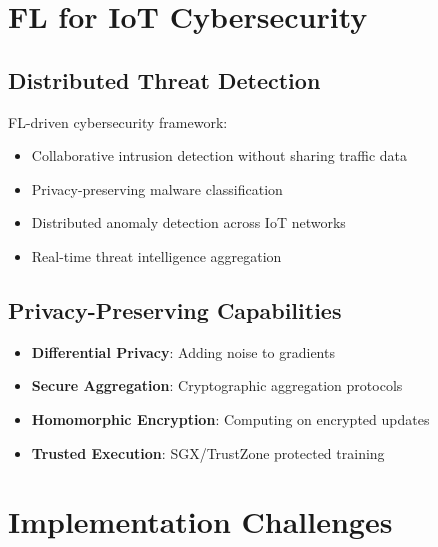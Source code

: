 \documentclass[12pt,a4paper]{article}
\begin{document}
\section{FL for IoT Cybersecurity}

\subsection{Distributed Threat Detection}

FL-driven cybersecurity framework:
\begin{itemize}
    \item Collaborative intrusion detection without sharing traffic data
    \item Privacy-preserving malware classification
    \item Distributed anomaly detection across IoT networks
    \item Real-time threat intelligence aggregation
\end{itemize}

\subsection{Privacy-Preserving Capabilities}

\begin{tcolorbox}[colback=privacygreen!10, colframe=privacygreen, title=Privacy Mechanisms]
\begin{itemize}
    \item \textbf{Differential Privacy}: Adding noise to gradients
    \item \textbf{Secure Aggregation}: Cryptographic aggregation protocols
    \item \textbf{Homomorphic Encryption}: Computing on encrypted updates
    \item \textbf{Trusted Execution}: SGX/TrustZone protected training
\end{itemize}
\end{tcolorbox}

\section{Implementation Challenges}
\end{document}

